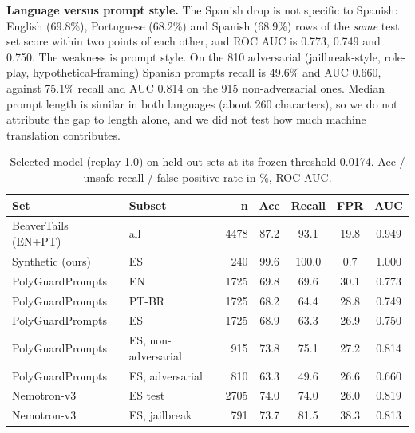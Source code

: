 \documentclass[conference]{IEEEtran}
\begin{document}
\textbf{Language versus prompt style.} The Spanish drop is not specific to Spanish: English (69.8\%), Portuguese (68.2\%) and Spanish (68.9\%) rows of the \emph{same} test set score within two points of each other, and ROC AUC is 0.773, 0.749 and 0.750. The weakness is prompt style. On the 810 adversarial (jailbreak-style, role-play, hypothetical-framing) Spanish prompts recall is 49.6\% and AUC 0.660, against 75.1\% recall and AUC 0.814 on the 915 non-adversarial ones. Median prompt length is similar in both languages (about 260 characters), so we do not attribute the gap to length alone, and we did not test how much machine translation contributes.

\begin{table}[t]
\caption{Selected model (replay 1.0) on held-out sets at its frozen threshold 0.0174. Acc / unsafe recall / false-positive rate in \%, ROC AUC.}\label{tab:ext}
\centering\small
\begin{tabular}{llrcccc}
\toprule
Set & Subset & n & Acc & Recall & FPR & AUC\\
\midrule
BeaverTails (EN+PT) & all & 4478 & 87.2 & 93.1 & 19.8 & 0.949\\
Synthetic (ours) & ES & 240 & 99.6 & 100.0 & 0.7 & 1.000\\
PolyGuardPrompts & EN & 1725 & 69.8 & 69.6 & 30.1 & 0.773\\
PolyGuardPrompts & PT-BR & 1725 & 68.2 & 64.4 & 28.8 & 0.749\\
PolyGuardPrompts & ES & 1725 & 68.9 & 63.3 & 26.9 & 0.750\\
PolyGuardPrompts & ES, non-adversarial & 915 & 73.8 & 75.1 & 27.2 & 0.814\\
PolyGuardPrompts & ES, adversarial & 810 & 63.3 & 49.6 & 26.6 & 0.660\\
Nemotron-v3 & ES test & 2705 & 74.0 & 74.0 & 26.0 & 0.819\\
Nemotron-v3 & ES, jailbreak & 791 & 73.7 & 81.5 & 38.3 & 0.813\\
\bottomrule
\end{tabular}
\end{table}
\end{document}
